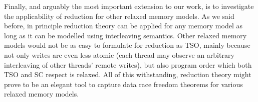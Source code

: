 \documentclass[preprint,9pt]{sigplanconf}
\begin{document}
Finally, and arguably the most important extension to our work, is to investigate the applicability of reduction for other relaxed memory models.
As we said before, in principle reduction theory can be applied for any memory model as long as it can be modelled using interleaving semantics.
Other relaxed memory models would not be as easy to formulate for reduction as TSO, mainly because not only writes are even less atomic (each thread may observe an arbitrary interleaving of other threads' remote writes), but also program order which both TSO and SC respect is relaxed.
All of this withstanding, reduction theory might prove to be an elegant tool to capture data race freedom theorems for various relaxed memory models.





\end{document}
